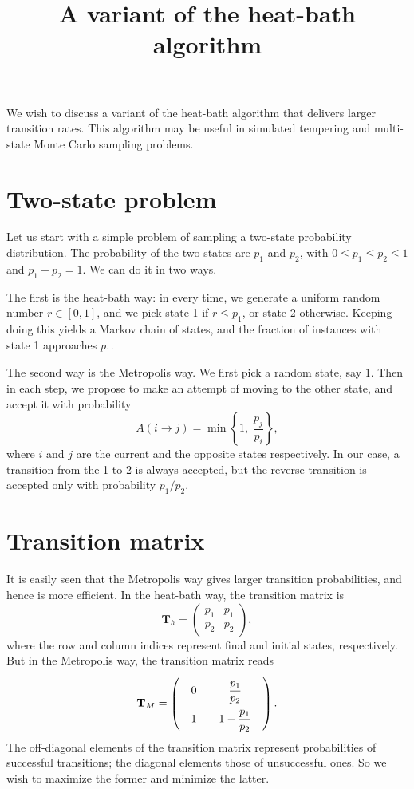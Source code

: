 \documentclass[12pt]{article}
\begin{document}
\title{A variant of the heat-bath algorithm}
\author{ \vspace{-10ex} }
\date{ \vspace{-10ex} }
\maketitle


We wish to discuss a variant of the heat-bath algorithm that delivers larger transition rates.
This algorithm may be useful in simulated tempering
and multi-state Monte Carlo sampling problems.


\section{Two-state problem}

Let us start with a simple problem of
sampling a two-state probability distribution.
%
The probability of the two states are $p_1$ and $p_2$,
with $0 \le p_1 \le p_2 \le 1$ and $p_1 + p_2 = 1$.
%
We can do it in two ways.


The first is the heat-bath way:
in every time, we generate a uniform random number $r \in [0, 1]$,
and we pick state 1 if $r \le p_1$, or state 2 otherwise.
%
Keeping doing this yields a Markov chain of states,
and the fraction of instances with state 1 approaches $p_1$.

The second way is the Metropolis way.
We first pick a random state, say $1$.
Then in each step,
we propose to make an attempt of moving to the other state,
and accept it with probability
\begin{equation}
  A(i \rightarrow j) = \min\left\{1, \; \frac{ p_j } { p_i } \right\},
  \label{eq:AMetropolis}
\end{equation}
where $i$ and $j$ are the current and the opposite states respectively.
In our case, a transition from the 1 to 2 is always accepted,
but the reverse transition is accepted
only with probability $p_1/p_2$.

\section{Transition matrix}

It is easily seen that
the Metropolis way gives larger transition probabilities,
and hence is more efficient.
%
In the heat-bath way, the transition matrix is
$$
\mathbf T_h =
\left(
  \begin{array}{ccc}
    p_1 & p_1 \\
    p_2 & p_2
  \end{array}
\right),
$$
where the row and column indices represent final and initial states,
respectively.
But in the Metropolis way, the transition matrix reads
$$
\mathbf T_M =
\left(
  \arraycolsep=10.0pt\def\arraystretch{2.0}
  \begin{array}{ccc}
    0 & \dfrac{ p_1 }{ p_2 }  \\
    1 & 1 - \dfrac{ p_1 }{ p_2 }
  \end{array}
\right).
$$
%
The off-diagonal elements of the transition matrix represent
probabilities of successful transitions;
the diagonal elements those of unsuccessful ones.
%
So we wish to maximize the former and minimize the latter.
\end{document}
